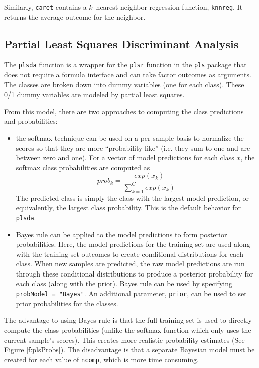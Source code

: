 \documentclass[12pt]{article}
\begin{document}
Similarly, \texttt{caret} contains a $k$--nearest neighbor regression function, \texttt{knnreg}. It returns the average outcome for the neighbor.


\subsection{Partial Least Squares Discriminant Analysis}

The \texttt{plsda} function is a wrapper for the \texttt{plsr} function in the \texttt{pls} package that does not require a formula interface and can take factor outcomes as arguments. The classes are broken down into dummy variables (one for each class). These 0/1 dummy variables are modeled by partial least squares. 

From this model, there are two approaches to computing the class predictions and probabilities:
\begin{itemize}
\item the softmax technique can be used on a per-sample basis to normalize the scores so that they are more ``probability like'' (i.e. they sum to one and are between zero and one). For a vector of model predictions for each class $x$, the softmax class probabilities are computed as
\[
prob_k= \frac{exp(x_k)}{\sum_{k=1}^C exp(x_k)}
\]
The predicted class is simply the class with the largest model prediction, or equivalently, the largest class probability. This is the default behavior for \texttt{plsda}.
\item Bayes rule can be applied to the model predictions to form posterior probabilities. Here, the model predictions for the training set are used along with the training set outcomes to create conditional distributions for each class. When new samples are predicted, the raw model predictions are run through these conditional distributions to produce a posterior probability for each class (along with the prior). Bayes rule can be used by specifying \texttt{probModel = "Bayes"}. An additional parameter, \texttt{prior}, can be used to set prior probabilities  for the classes.
\end{itemize}
The advantage to using Bayes rule is that the full training set is used to directly compute the class probabilities (unlike the softmax function which only uses the current sample's scores). This creates more realistic probability estimates (See Figure \ref{f:plsProbs}). The disadvantage is that a separate Bayesian model must be created for each value of \texttt{ncomp}, which is more time consuming.  
 
\end{document}
